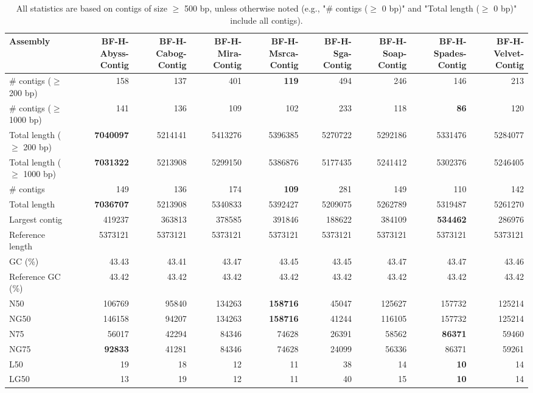 \documentclass[12pt,a4paper]{article}
\begin{document}
\begin{table}[ht]
\begin{center}
\caption{All statistics are based on contigs of size $\geq$ 500 bp, unless otherwise noted (e.g., "\# contigs ($\geq$ 0 bp)" and "Total length ($\geq$ 0 bp)" include all contigs).}
\begin{tabular}{|l*{8}{|r}|}
\hline
Assembly & BF-H-Abyss-Contig & BF-H-Cabog-Contig & BF-H-Mira-Contig & BF-H-Msrca-Contig & BF-H-Sga-Contig & BF-H-Soap-Contig & BF-H-Spades-Contig & BF-H-Velvet-Contig \\ \hline
\# contigs ($\geq$ 200 bp) & 158 & 137 & 401 & {\bf 119} & 494 & 246 & 146 & 213 \\ \hline
\# contigs ($\geq$ 1000 bp) & 141 & 136 & 109 & 102 & 233 & 118 & {\bf 86} & 120 \\ \hline
Total length ($\geq$ 200 bp) & {\bf 7040097} & 5214141 & 5413276 & 5396385 & 5270722 & 5292186 & 5331476 & 5284077 \\ \hline
Total length ($\geq$ 1000 bp) & {\bf 7031322} & 5213908 & 5299150 & 5386876 & 5177435 & 5241412 & 5302376 & 5246405 \\ \hline
\# contigs & 149 & 136 & 174 & {\bf 109} & 281 & 149 & 110 & 142 \\ \hline
Total length & {\bf 7036707} & 5213908 & 5340833 & 5392427 & 5209075 & 5262789 & 5319487 & 5261270 \\ \hline
Largest contig & 419237 & 363813 & 378585 & 391846 & 188622 & 384109 & {\bf 534462} & 286976 \\ \hline
Reference length & 5373121 & 5373121 & 5373121 & 5373121 & 5373121 & 5373121 & 5373121 & 5373121 \\ \hline
GC (\%) & 43.43 & 43.41 & 43.47 & 43.45 & 43.45 & 43.47 & 43.47 & 43.46 \\ \hline
Reference GC (\%) & 43.42 & 43.42 & 43.42 & 43.42 & 43.42 & 43.42 & 43.42 & 43.42 \\ \hline
N50 & 106769 & 95840 & 134263 & {\bf 158716} & 45047 & 125627 & 157732 & 125214 \\ \hline
NG50 & 146158 & 94207 & 134263 & {\bf 158716} & 41244 & 116105 & 157732 & 125214 \\ \hline
N75 & 56017 & 42294 & 84346 & 74628 & 26391 & 58562 & {\bf 86371} & 59460 \\ \hline
NG75 & {\bf 92833} & 41281 & 84346 & 74628 & 24099 & 56336 & 86371 & 59261 \\ \hline
L50 & 19 & 18 & 12 & 11 & 38 & 14 & {\bf 10} & 14 \\ \hline
LG50 & 13 & 19 & 12 & 11 & 40 & 15 & {\bf 10} & 14 \\ \hline

\end{tabular}
\end{center}
\end{table}
\end{document}
